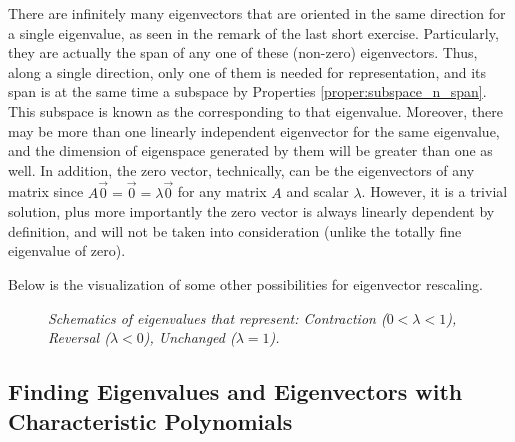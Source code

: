 There are infinitely many eigenvectors that are oriented in the same direction for a single eigenvalue, as seen in the remark of the last short exercise. Particularly, they are actually the span of any one of these (non-zero) eigenvectors. Thus, along a single direction, only one of them is needed for representation, and its span is at the same time a subspace by Properties \ref{proper:subspace_n_span}. This subspace is known as the  corresponding to that eigenvalue. Moreover, there may be more than one linearly independent eigenvector for the same eigenvalue, and the dimension of eigenspace generated by them will be greater than one as well. In addition, the zero vector, technically, can be the eigenvectors of any matrix since $A\vec{0} = \vec{0} = \lambda\vec{0}$ for any matrix $A$ and scalar $\lambda$. However, it is a trivial solution, plus more importantly the zero vector is always linearly dependent by definition, and will not be taken into consideration (unlike the totally fine eigenvalue of zero).\par
Below is the visualization of some other possibilities for eigenvector rescaling.
\begin{figure}[h!]
\centering
{}
\caption{\textit{Schematics of eigenvalues that represent: Contraction ($0 < \lambda < 1$), Reversal ($\lambda < 0$), Unchanged ($\lambda = 1$).}}
\end{figure}

\subsection{Finding Eigenvalues and Eigenvectors with Characteristic Polynomials}

